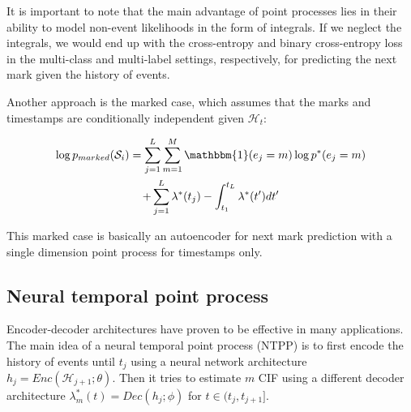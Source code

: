 \documentclass[journal,twoside,web]{ieeecolor}
\begin{document}
 It is important to note that the main advantage of point processes lies in their ability to model non-event likelihoods in the form of integrals. If we neglect the integrals, we would end up with the cross-entropy and binary cross-entropy loss in the multi-class and multi-label settings, respectively, for predicting the next mark given the history of events.
 
 Another approach is the marked case, which assumes that the marks and timestamps are conditionally independent given $\mathcal{H}_t$:
 
 \begin{multline} \label{eq:CIF-marked}
     \log p_{marked}(\mathcal{S}_{i}) =    
     \sum_{j = 1}^{L}\sum_{m = 1}^{M} \mathbbm{1}(e_j=m)   \log p^{*}(e_j=m) \\
     +\sum_{j = 1}^{L}\lambda^{*}(t_j) - \int_{t_1}^{t_{L}}\lambda^{*}(t^{\prime})dt^{\prime}  
 \end{multline} 
 
 This marked case is basically an autoencoder for next mark prediction with a single dimension point process for timestamps only.
 
 

\subsection{Neural temporal point process}

Encoder-decoder architectures have proven to be effective in many applications. The main idea of a neural temporal point process (NTPP) is to first encode the history of events until $t_j$ using a neural network architecture $h_j=Enc(\mathcal{H}_{j+1};\theta)$. Then it tries to estimate $m$ CIF using a different decoder architecture $\lambda^*_m(t)=Dec(h_j;\phi)$ for $ t \in (t_j,t_{j+1}]$.

\end{document}
